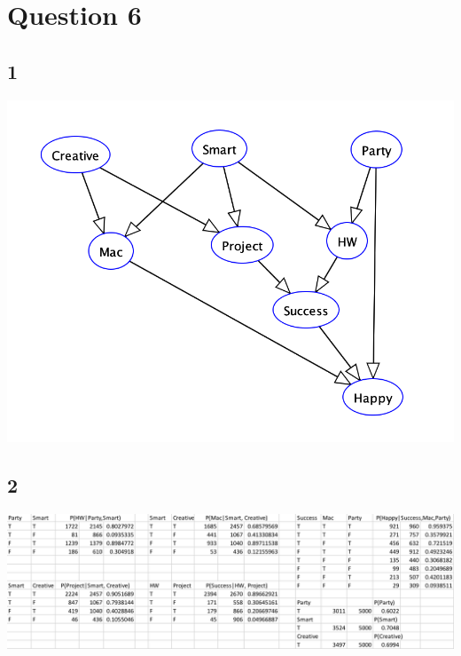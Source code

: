 \documentclass[letterpaper, 12pt]{artikel3}
\begin{document}
\section*{Question 6}
\subsection*{1} %
\includegraphics[scale=0.6]{QQ20191109-1232162x.png}
\subsection*{2}%
\includegraphics[scale=0.5]{QQ20191100.png}
\end{document}
